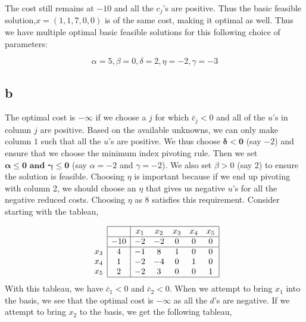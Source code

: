 The cost still remains at $-10$ and all the $c_j$'s are positive. Thus the basic feasible solution,$x = (1,1,7,0,0)$ is of the same cost, making it optimal as well. Thus we have multiple optimal basic feasible solutions for this following choice of parameters:

$$
\alpha=5, \beta=0, \delta=2, \eta=-2, \gamma=-3
$$

\subsection*{b}
The optimal cost is $- \infty$ if we choose a $j$ for which $\bar{c}_j < 0$ and all of the $u$'s in column $j$ are positive. Based on the available unknowns, we can only make column $1$ such that all the $u$'s are positive. We thus choose $\boldsymbol{\delta < 0}$ (say $-2$) and ensure that we choose the minimum index pivoting rule. Then we set $\boldsymbol{\alpha \le 0 \text{ and } \gamma \le 0}$ (say $\alpha = -2$ and $\gamma = -2$). We also set $\beta > 0 $ (say 2) to ensure the solution is feasible. Choosing $\eta$ is important because if we end up pivoting with column 2, we should choose an $\eta$ that gives us negative $u$'s for all the negative reduced costs. Choosing $\eta$ as 8 satisfies this requirement. Consider starting with the tableau, 

$$
\begin{array}{c}
\\
 \\
x_3 \\
x_4 \\ 
x_5 \\
\end{array}
\begin{array}{|c|ccccc|}
    \hline
    & x_1 & x_2 & x_3 & x_4 & x_5\\ \hline
  -10 & -2 & -2 & 0 & 0 & 0\\ \hline
  4 & -1 & 8 & 1 & 0 & 0\\
  1 & -2 & -4 & 0 & 1 & 0\\
  2 & -2 & 3 & 0 & 0 & 1\\\hline
\end{array}
$$
With this tableau, we have $\bar{c}_1<0$ and $\bar{c}_2<0$. When we attempt to bring $x_1$ into the basis, we see that the optimal cost is $- \infty$ as all the $d$'s are negative. If we attempt to bring $x_2$ to the basis, we get the following tableau,

